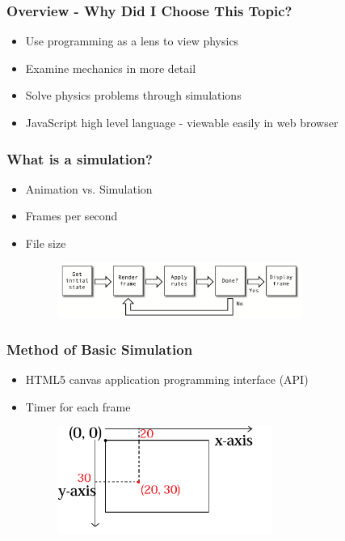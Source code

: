 \documentclass{beamer}
\begin{document}
\begin{frame}
\frametitle{Overview - Why Did I Choose This Topic?}
\begin{itemize}
\item Use programming as a lens to view physics
\item Examine mechanics in more detail
\item Solve physics problems through simulations
\item JavaScript high level language -  viewable easily in web browser

\end{itemize}
\end{frame}



\begin{frame}
\frametitle{What is a simulation?}

\begin{itemize}

\item Animation vs. Simulation
\item Frames per second
\item File size

\vspace{1cm}
\begin{figure}[h] 
	\centering
		\includegraphics[width=8cm]{frames.png}

	\label{fig:frames}
\end{figure}
\end{itemize}
\end{frame}






\begin{frame}
\frametitle{Method of Basic Simulation}
\begin{itemize}

\item HTML5 canvas application programming interface (API)
\item Timer for each frame

\vspace{1cm}
\begin{figure}[h] 
	\centering
		\includegraphics[width=7cm]{canvas.png}

	\label{fig:frames}
\end{figure}

\end{itemize}
\end{frame}
\end{document}
